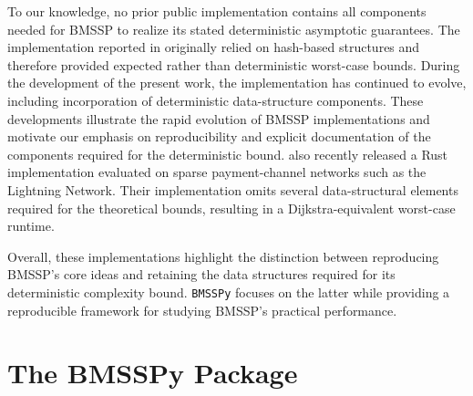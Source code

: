 \documentclass[ijoc,blindrev]{informs3} %
\begin{document}
To our knowledge, no prior public implementation contains all components needed for BMSSP to realize its stated deterministic asymptotic guarantees. 
{\color{blue} The implementation reported in \citet{castro2025implementation} originally relied on hash-based structures and therefore provided expected rather than deterministic worst-case bounds. During the development of the present work, the implementation has continued to evolve, including incorporation of deterministic data-structure components. These developments illustrate the rapid evolution of BMSSP implementations and motivate our emphasis on reproducibility and explicit documentation of the components required for the deterministic bound.}
\cite{valko_outperforming_2025} also recently released a Rust implementation evaluated on sparse payment-channel networks such as the Lightning Network. Their implementation omits several data-structural elements required for the theoretical bounds, resulting in a Dijkstra-equivalent worst-case runtime. %

{\color{blue}
Overall, these implementations highlight the distinction between reproducing BMSSP's core ideas and retaining the data structures required for its deterministic complexity bound. \texttt{BMSSPy} focuses on the latter while providing a reproducible framework for studying BMSSP's practical performance.
}


\section{The BMSSPy Package}\label{sec:pack}
\end{document}
